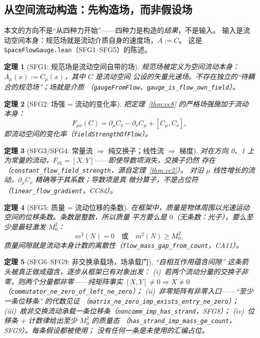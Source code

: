 \documentclass[aps,prd,preprint,superscriptaddress,amsmath,amssymb]{revtex4-2}
\newtheorem{theorem}{定理}[section]
\begin{document}
\subsection{从空间流动构造：先构造场，而非假设场}
\label{sec:flow-construction}

本文的方向不是``从四种力开始''——四种力是构造的\emph{结果}，不是输入。
输入是流动空间本身：规范场就是流动介质自身的速度场，$A:=C$。
这是 \texttt{SpaceFlowGauge.lean}（SFG1--SFG5）的陈述。

\begin{theorem}[SFG1: 规范场是流动空间自带的场]
\label{thm:sfg1}
规范场被定义为空间流动本身：$A_\mu(x):=C_\mu(x)$，其中 $C$ 是流动空间
公设的矢量光速场。不存在独立的``待耦合的规范场''；场就是介质
（\texttt{gaugeFromFlow}、\texttt{gauge\_is\_flow\_own\_field}）。
\end{theorem}

\begin{theorem}[SFG2: 场强 = 流动的变化率]
\label{thm:sfg2}
把定理~\ref{thm:cc8} 的严格场强施加于流动本身：
\begin{equation}
F_{\mu\nu}(C)=\partial_\mu C_\nu-\partial_\nu C_\mu+[C_\mu,C_\nu],
\label{eq:flow-F}
\end{equation}
即流动空间的变化率（\texttt{fieldStrengthOfFlow}）。
\end{theorem}

\begin{theorem}[SFG3/SFG4: 常量流 $\Rightarrow$ 纯交换子；线性流 $\Rightarrow$ 梯度]
\label{thm:sfg3}
对在方向 0、1 上为常量的流动，$F_{01}=[X,Y]$——即使导数项消失，交换子仍然
存在（\texttt{constant\_flow\_field\_strength}，源自定理~\ref{thm:cc2}）。
对沿 $\mu$ 线性增长的流动，$\partial_\mu C_\nu$ 精确等于其系数；导数项是真
微分算子，不是占位符（\texttt{linear\_flow\_gradient}，CC8d）。
\end{theorem}

\begin{theorem}[SFG5: 质量 = 流动位移的条数]
\label{thm:sfg5}
在框架中，质量是物体周围以光速运动空间的\emph{位移条数}。条数是整数，所以质量
平方要么是 $0$（无条数：光子），要么至少是最轻激发 $M_0^2$：
\begin{equation}
m^2(N)=0 \quad\text{或}\quad m^2(N)\ge M_0^2,
\label{eq:sfg-gap}
\end{equation}
质量间隙就是流动本身计数的离散性（\texttt{flow\_mass\_gap\_from\_count}，CA11）。
\end{theorem}

\begin{theorem}[SFG6--SFG9: 非交换承载场，场承载门]
\label{thm:sfg6}
``自相互作用蕴含间隙'' 这条箭头被真正做成蕴含，逐步从框架已有对象出发：
(i)~若两个流动分量的交换子非零，则两个分量都非零——纯矩阵事实
$[X,Y]\neq0\Rightarrow X\neq0$（\texttt{commutator\_ne\_zero\_of\_left\_ne\_zero}）；
(ii)~非零矩阵有非零入口——``至少一条位移条'' 的代数见证
（\texttt{matrix\_ne\_zero\_imp\_exists\_entry\_ne\_zero}）；
(iii)~故非交换流动承载一条位移条（\texttt{noncomm\_imp\_has\_strand}，SFG8）；
(iv)~位移条 + 计数律给出至少 $M_0^2$ 的质量态
（\texttt{has\_strand\_imp\_mass\_ge\_count}，SFG9）。每条假设都被使用；
没有任何一条是未使用的汇编占位。
\end{theorem}
\end{document}
